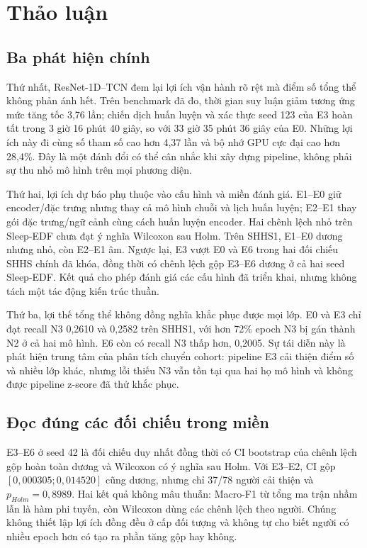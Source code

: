 \section{Thảo luận}
\label{sec:discussion}

\subsection{Ba phát hiện chính}

Thứ nhất, ResNet-1D--TCN đem lại lợi ích vận hành rõ rệt mà điểm số tổng thể không phản ánh hết. Trên benchmark đã đo, thời gian suy luận giảm tương ứng mức tăng tốc 3,76 lần; chiến dịch huấn luyện và xác thực seed 123 của E3 hoàn tất trong 3 giờ 16 phút 40 giây, so với 33 giờ 35 phút 36 giây của E0. Những lợi ích này đi cùng số tham số cao hơn 4,37 lần và bộ nhớ GPU cực đại cao hơn 28,4\%. Đây là một đánh đổi có thể cân nhắc khi xây dựng pipeline, không phải sự thu nhỏ mô hình trên mọi phương diện.

Thứ hai, lợi ích dự báo phụ thuộc vào cấu hình và miền đánh giá. E1--E0 giữ encoder/đặc trưng nhưng thay cả mô hình chuỗi và lịch huấn luyện; E2--E1 thay gói đặc trưng/ngữ cảnh cùng cách huấn luyện encoder. Hai chênh lệch nhỏ trên Sleep-EDF chưa đạt ý nghĩa Wilcoxon sau Holm. Trên SHHS1, E1--E0 dương nhưng nhỏ, còn E2--E1 âm. Ngược lại, E3 vượt E0 và E6 trong hai đối chiếu SHHS chính đã khóa, đồng thời có chênh lệch gộp E3--E6 dương ở cả hai seed Sleep-EDF. Kết quả cho phép đánh giá các cấu hình đã triển khai, nhưng không tách một tác động kiến trúc thuần.

Thứ ba, lợi thế tổng thể không đồng nghĩa khắc phục được mọi lớp. E0 và E3 chỉ đạt recall N3 0,2610 và 0,2582 trên SHHS1, với hơn 72\% epoch N3 bị gán thành N2 ở cả hai mô hình. E6 còn có recall N3 thấp hơn, 0,2005. Sự tái diễn này là phát hiện trung tâm của phân tích chuyển cohort: pipeline E3 cải thiện điểm số và nhiều lớp khác, nhưng lỗi thiếu N3 vẫn tồn tại qua hai họ mô hình và không được pipeline z-score đã thử khắc phục.

\subsection{Đọc đúng các đối chiếu trong miền}

E3--E6 ở seed 42 là đối chiếu duy nhất đồng thời có CI bootstrap của chênh lệch gộp hoàn toàn dương và Wilcoxon có ý nghĩa sau Holm. Với E3--E2, CI gộp $[0,000305;0,014520]$ cũng dương, nhưng chỉ 37/78 người cải thiện và $p_{Holm}=0,8989$. Hai kết quả không mâu thuẫn: Macro-F1 từ tổng ma trận nhầm lẫn là hàm phi tuyến, còn Wilcoxon dùng các chênh lệch theo người. Chúng không thiết lập lợi ích đồng đều ở cấp đối tượng và không tự cho biết người có nhiều epoch hơn có tạo ra phần tăng gộp hay không.

